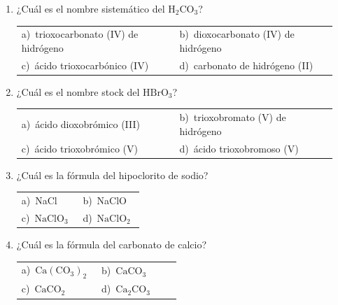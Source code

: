 \documentclass[11pt,a4paper]{article}
\begin{document}
\begin{enumerate}[label=\textbf{\arabic*.},leftmargin=*,itemsep=11pt,topsep=0pt]
\item \begin{minipage}[t]{\linewidth}
¿Cuál es el nombre sistemático del $\mathrm{H_{2}CO_{3}}$?

\vspace{5pt}
\begin{tabular}{@{}p{0.47\linewidth}p{0.47\linewidth}@{}}
a)~trioxocarbonato (IV) de hidrógeno & b)~dioxocarbonato (IV) de hidrógeno \\
c)~ácido trioxocarbónico (IV) & d)~carbonato de hidrógeno (II) \\
\end{tabular}
\end{minipage}

\item \begin{minipage}[t]{\linewidth}
¿Cuál es el nombre stock del $\mathrm{HBrO_{3}}$?

\vspace{5pt}
\begin{tabular}{@{}p{0.47\linewidth}p{0.47\linewidth}@{}}
a)~ácido dioxobrómico (III) & b)~trioxobromato (V) de hidrógeno \\
c)~ácido trioxobrómico (V) & d)~ácido trioxobromoso (V) \\
\end{tabular}
\end{minipage}

\item \begin{minipage}[t]{\linewidth}
¿Cuál es la fórmula del hipoclorito de sodio?

\vspace{5pt}
\begin{tabular}{@{}p{0.47\linewidth}p{0.47\linewidth}@{}}
a)~NaCl & b)~NaClO \\
c)~$\mathrm{NaClO_{3}}$ & d)~$\mathrm{NaClO_{2}}$ \\
\end{tabular}
\end{minipage}

\item \begin{minipage}[t]{\linewidth}
¿Cuál es la fórmula del carbonato de calcio?

\vspace{5pt}
\begin{tabular}{@{}p{0.47\linewidth}p{0.47\linewidth}@{}}
a)~$\mathrm{Ca(CO_{3})_{2}}$ & b)~$\mathrm{CaCO_{3}}$ \\
c)~$\mathrm{CaCO_{2}}$ & d)~$\mathrm{Ca_{2}CO_{3}}$ \\
\end{tabular}
\end{minipage}


\end{enumerate}
\end{document}
